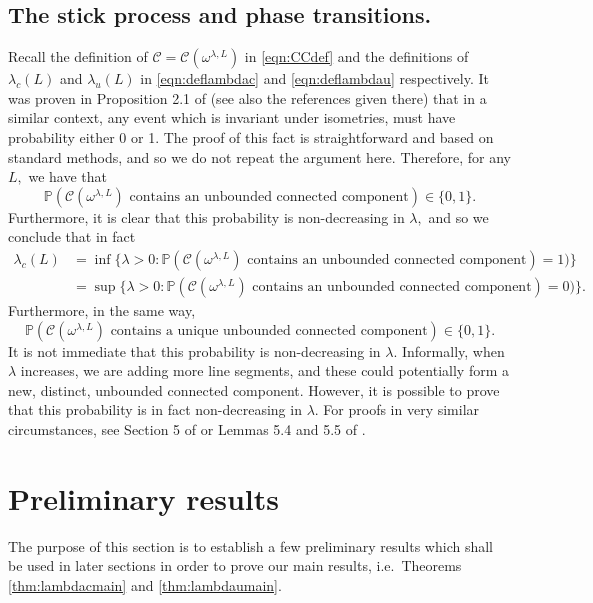 \documentclass[a4paper,12pt]{article}
\newcommand{\BP}{{\mathbb{P}}}
\newcommand{\CC}{{\mathcal{C}}}
\begin{document}
\subsection{The stick process and phase transitions.} \label{sec:stickprocess}
Recall the definition of $\CC=\CC(\omega^{\lambda,L})$ in \eqref{eqn:CCdef} and the definitions
of $\lambda_c(L)$ and $\lambda_u(L)$ in \eqref{eqn:deflambdac}
and \eqref{eqn:deflambdau} respectively.
It was proven in Proposition 2.1 of \cite{BT_15} (see also the references given there) that in a similar context,
any event which is invariant
under isometries, must have probability either 0 or 1. The proof of this fact is
straightforward and based on standard methods, and so we do not repeat 
the argument here. Therefore, for any $L,$ we have that
\[
\BP(\CC(\omega^{\lambda,L}) 
\textrm{ contains an unbounded connected component})\in \{0,1\}.
\]
Furthermore, it is clear that this probability 
is non-decreasing in $\lambda,$ and so we conclude that in fact 
\begin{align*}
    \lambda_c(L) & =\inf\{\lambda>0: \BP(\CC(\omega^{\lambda,L}) 
\textrm{ contains an unbounded connected component})=1)\} \\
& =\sup\{\lambda>0: \BP(\CC(\omega^{\lambda,L}) 
\textrm{ contains an unbounded connected component})=0)\}.
\end{align*}
Furthermore, in the same way,
\[
\BP(\CC(\omega^{\lambda,L}) 
\textrm{ contains a unique unbounded connected component})\in \{0,1\}.
\]
It is not immediate that this probability
is non-decreasing in $\lambda.$ Informally, when $\lambda$ increases, we are adding 
more line segments, and these could potentially form a new, distinct, 
unbounded connected component. However, it is possible to prove that this 
probability is in fact non-decreasing in $\lambda$.
For proofs in very similar circumstances, see Section 5 of \cite{HJ_06} or 
Lemmas 5.4 and 5.5 of \cite{T_07}. 





\section{Preliminary results} \label{sec:preliminaries}
The purpose of this section is to establish a few preliminary results which shall be used in later sections 
in order to prove our main results, i.e.\ Theorems \ref{thm:lambdacmain} and \ref{thm:lambdaumain}.
\end{document}
